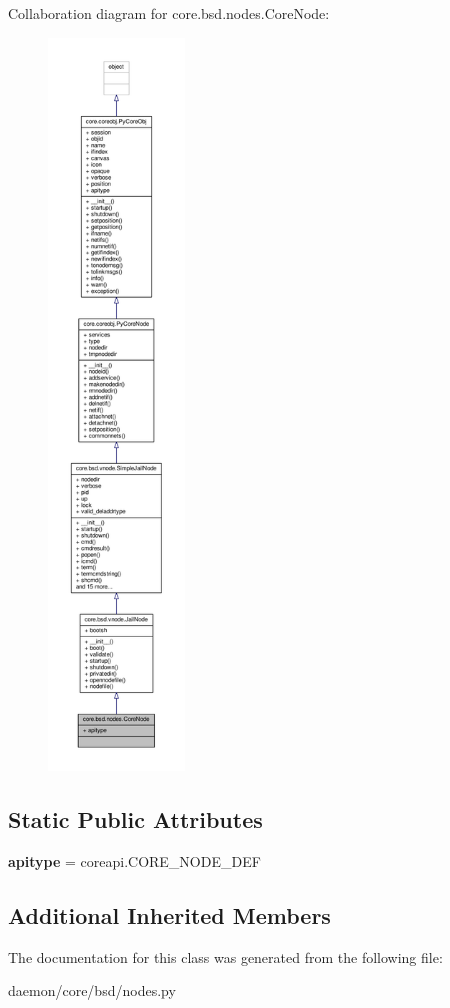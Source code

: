 Collaboration diagram for core.\+bsd.\+nodes.\+Core\+Node\+:
\nopagebreak
\begin{figure}[H]
\begin{center}
\leavevmode
\includegraphics[height=550pt]{classcore_1_1bsd_1_1nodes_1_1_core_node__coll__graph}
\end{center}
\end{figure}
\subsection*{Static Public Attributes}
\begin{DoxyCompactItemize}
\item 
\hypertarget{classcore_1_1bsd_1_1nodes_1_1_core_node_a0373e073be91061dd7350baadf89b275}{{\bfseries apitype} = coreapi.\+C\+O\+R\+E\+\_\+\+N\+O\+D\+E\+\_\+\+D\+E\+F}\label{classcore_1_1bsd_1_1nodes_1_1_core_node_a0373e073be91061dd7350baadf89b275}

\end{DoxyCompactItemize}
\subsection*{Additional Inherited Members}


The documentation for this class was generated from the following file\+:\begin{DoxyCompactItemize}
\item 
daemon/core/bsd/nodes.\+py\end{DoxyCompactItemize}
